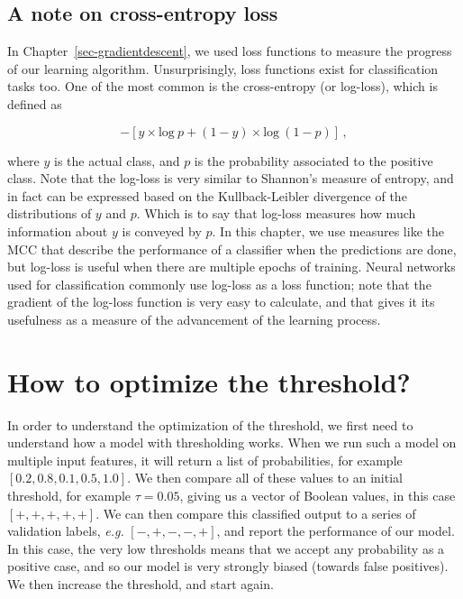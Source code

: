 \documentclass[
  letterpaper,
]{scrbook}
\begin{document}
\subsection{A note on cross-entropy
loss}\label{a-note-on-cross-entropy-loss}

In Chapter~\ref{sec-gradientdescent}, we used loss functions to measure
the progress of our learning algorithm. Unsurprisingly, loss functions
exist for classification tasks too. One of the most common is the
cross-entropy (or log-loss), which is defined as

\[
−\left[y \times \text{log}\ p+(1−y)\times \text{log}\ (1−p)\right] \,,
\]

where \(y\) is the actual class, and \(p\) is the probability associated
to the positive class. Note that the log-loss is very similar to
Shannon's measure of entropy, and in fact can be expressed based on the
Kullback-Leibler divergence of the distributions of \(y\) and \(p\).
Which is to say that log-loss measures how much information about \(y\)
is conveyed by \(p\). In this chapter, we use measures like the MCC that
describe the performance of a classifier when the predictions are done,
but log-loss is useful when there are multiple epochs of training.
Neural networks used for classification commonly use log-loss as a loss
function; note that the gradient of the log-loss function is very easy
to calculate, and that gives it its usefulness as a measure of the
advancement of the learning process.

\section{How to optimize the
threshold?}\label{how-to-optimize-the-threshold}

In order to understand the optimization of the threshold, we first need
to understand how a model with thresholding works. When we run such a
model on multiple input features, it will return a list of
probabilities, for example \([0.2, 0.8, 0.1, 0.5, 1.0]\). We then
compare all of these values to an initial threshold, for example
\(\tau = 0.05\), giving us a vector of Boolean values, in this case
\([+, +, +, +, +]\). We can then compare this classified output to a
series of validation labels, \emph{e.g.} \([-, +, -, -, +]\), and report
the performance of our model. In this case, the very low thresholds
means that we accept any probability as a positive case, and so our
model is very strongly biased (towards false positives). We then
increase the threshold, and start again.
\end{document}
